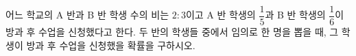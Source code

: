 어느 학교의 A 반과 B 반 학생 수의 비는 $2:3$이고 A 반 학생의 $\dfrac{1}{5}$과 B 반 학생의 $\dfrac{1}{6}$이 방과 후 수업을 신청했다고 한다. 두 반의 학생들 중에서 임의로 한 명을 뽑을 때, 그 학생이 방과 후 수업을 신청했을 확률을 구하시오.
